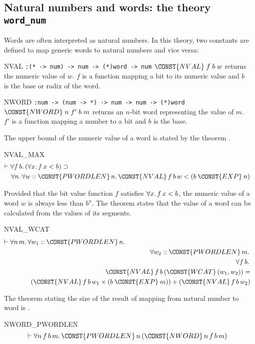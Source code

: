 \subsection{Natural numbers and words: the theory {\tt word\_num}}
\label{sec-word_num}
Words are often interpreted as natural numbers. In this theory, two
constants are defined to map generic words to natural numbers and vice versa:
\begin{center}
\begin{constants}
\item[NVAL] \verb":(* -> num) -> num -> (*)word -> num" \newline
        $\CONST{NVAL}\;f\;b\;w$ returns the numeric value of $w$.
        $f$ is a function mapping a bit to its numeric value and
        $b$ is the base or  radix of the word.
\item[NWORD] \verb":num -> (num -> *) -> num -> num -> (*)word"\newline
        $\CONST{NWORD}\;n\;f'\;b\;m$ returns an $n$-bit word representing
        the value of $m$. $f'$ is a function mapping a number to a bit and
        $b$ is the base.
\end{constants}
\end{center}
The upper bound of the numeric value of a word is stated by the
theorem .
\begin{holthm}{NVAL_MAX}
\begin{eqnarray*}
\lefteqn{\THM \FORALL f \,b\DOT
        (\FORALL x\DOT f \,x \LES  b) \IMP } \\
 & & \FORALL n\DOT \FORALL w :: \CONST{PWORDLEN} \,n\DOT 
      \CONST{NVAL} \,f \,b \,w \LES ( b \:\CONST{EXP}\: n )
\end{eqnarray*}
\end{holthm}
Provided that the bit value function $f$ satisfies $\FORALL x\DOT f
\,x \LES  b$, the numeric value of a word $w$ is always less than
$b^n$. The theorem  states that the
value of a word can be calculated from the values of its segments.
\begin{holthm}{NVAL_WCAT}
\begin{eqnarray*}
\lefteqn{\THM \FORALL n\,m \DOT \FORALL w_1 :: \CONST{PWORDLEN} \,n\DOT} \\
 & & {} \FORALL w_2 :: \CONST{PWORDLEN} \,m\DOT \\
 & & \quad \FORALL f \,b\DOT\\
 & & \qquad \CONST{NVAL} \,f \,b \,(\CONST{WCAT} \,(w_{1},w_{2})) =\\
 & & \qquad \quad (\CONST{NVAL} \,f \,b \,w_{1} \MUL 
                                 ( b \:\CONST{EXP}\: m )) +
                                 (\CONST{NVAL} \,f \,b \,w_{2})
\end{eqnarray*}
\end{holthm}
The theorem stating the size of the result of mapping from natural
number to word is .
\begin{holthm}{NWORD_PWORDLEN}
\[\THM \FORALL n \,f \,b \,m\DOT
        \CONST{PWORDLEN}\,n \,(\CONST{NWORD} \,n \,f \,b \,m)
\]
\end{holthm}

